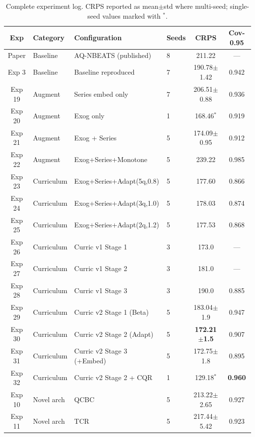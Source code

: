 \begin{table}[H]
\centering
\caption{Complete experiment log. CRPS reported as mean$\pm$std where
multi-seed; single-seed values marked with $^*$.}
\label{tab:full_exp_log}
\begin{tabular}{clllcc}
\toprule
\textbf{Exp} & \textbf{Category} & \textbf{Configuration} &
\textbf{Seeds} & \textbf{CRPS} & \textbf{Cov-0.95} \\
\midrule
Paper  & Baseline & AQ-NBEATS (published)     & 8   & 211.22           & --- \\
Exp 3  & Baseline & Baseline reproduced        & 7   & 190.78$\pm$1.42  & 0.942 \\
\midrule
Exp 19 & Augment  & Series embed only          & 7   & 206.51$\pm$0.88  & 0.936 \\
Exp 20 & Augment  & Exog only                  & 1   & 168.46$^*$       & 0.919 \\
Exp 21 & Augment  & Exog + Series              & 5   & 174.09$\pm$0.95  & 0.912 \\
Exp 22 & Augment  & Exog+Series+Monotone       & 5   & 239.22           & 0.985 \\
\midrule
Exp 23 & Curriculum & Exog+Series+Adapt(5q,0.8)& 5   & 177.60           & 0.866 \\
Exp 24 & Curriculum & Exog+Series+Adapt(3q,1.0)& 5   & 178.03           & 0.874 \\
Exp 25 & Curriculum & Exog+Series+Adapt(2q,1.2)& 5   & 177.53           & 0.868 \\
Exp 26 & Curriculum & Curric v1 Stage 1         & 3   & 173.0            & --- \\
Exp 27 & Curriculum & Curric v1 Stage 2         & 3   & 181.0            & --- \\
Exp 28 & Curriculum & Curric v1 Stage 3         & 3   & 190.0            & 0.885 \\
Exp 29 & Curriculum & Curric v2 Stage 1 (Beta)  & 5   & 183.04$\pm$1.9   & 0.947 \\
Exp 30 & Curriculum & Curric v2 Stage 2 (Adapt) & 5   & \textbf{172.21}$\pm$\textbf{1.5} & 0.907 \\
Exp 31 & Curriculum & Curric v2 Stage 3 (+Embed)& 5   & 172.75$\pm$1.8   & 0.895 \\
Exp 32 & Curriculum & Curric v2 Stage 2 + CQR   & 1   & 129.18$^*$       & \textbf{0.960} \\
\midrule
Exp 10 & Novel arch & QCBC                      & 5   & 213.22$\pm$2.65  & 0.927 \\
Exp 11 & Novel arch & TCR                       & 5   & 217.44$\pm$5.42  & 0.923 \\

\end{tabular}
\end{table}
